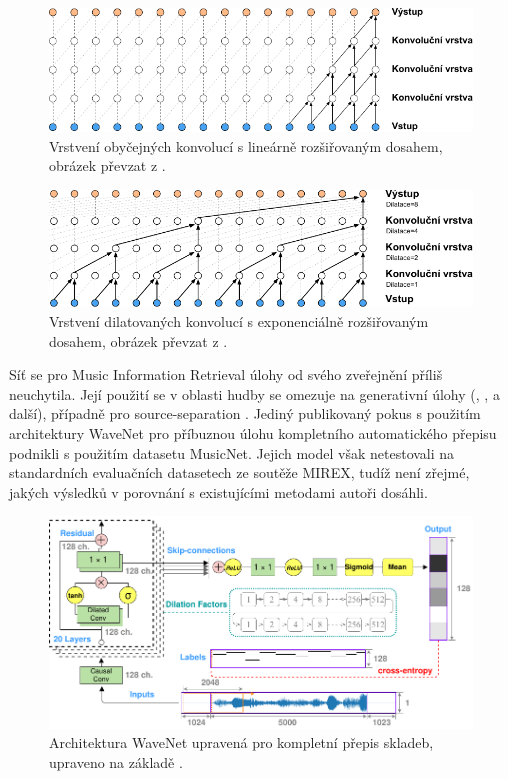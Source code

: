 \begin{figure}[h]\centering
\includegraphics{../img/wavenet_konvoluce}
\caption{Vrstvení obyčejných konvolucí s lineárně rozšiřovaným dosahem, obrázek převzat z \cite{Oord2016}.}
\label{obr:wavenet_conv}
\end{figure}

\begin{figure}[h]\centering
\includegraphics{../img/wavenet_dilatace_konvoluce}
\caption{Vrstvení dilatovaných konvolucí s exponenciálně rozšiřovaným dosahem, obrázek převzat z \cite{Oord2016}.}
\label{obr:wavenet_dilated}
\end{figure}

Síť se pro Music Information Retrieval úlohy od svého zveřejnění příliš neuchytila. Její použití se v oblasti hudby se omezuje na generativní úlohy (\cite{Hawthorne2018a}, \cite{Yang2017}, \cite{Engel2017} a další), případně pro source-separation \citep{Stoller2018}. Jediný publikovaný pokus s použitím architektury WaveNet pro příbuznou úlohu kompletního automatického přepisu podnikli \cite{Martak2018} s použitím datasetu MusicNet. Jejich model však netestovali na standardních evaluačních datasetech ze soutěže MIREX, tudíž není zřejmé, jakých výsledků v porovnání s existujícími metodami autoři dosáhli.



\begin{figure}[h]\centering
\includegraphics{../img/wavenet_arch}
\caption{Architektura WaveNet upravená pro kompletní přepis skladeb, upraveno na základě \cite{Martak2018}.}
\label{obr:wavenet_arch}
\end{figure}

